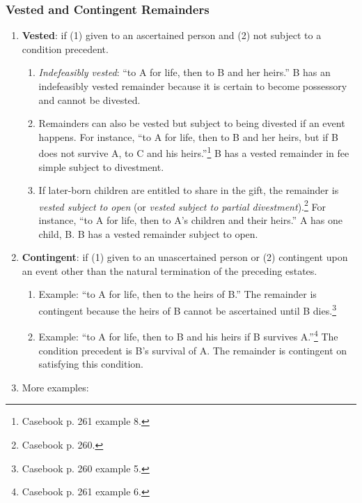 \subsubsection{Vested and Contingent Remainders}

\begin{enumerate}
    \item \textbf{Vested}: if (1) given to an ascertained person and (2) not 
    subject to a condition precedent.
    \begin{enumerate}
        \item \emph{Indefeasibly vested}:  ``to A for life, then to B and her 
        heirs.'' B has an indefeasibly vested remainder because it is certain 
        to become possessory and cannot be divested.
        \item Remainders can also be vested but subject to being divested if 
        an event happens. For instance, ``to A for life, then to B and her 
        heirs, but if B does not survive A, to C and his 
        heirs.''\footnote{Casebook p. 261 example 8.} B has a vested remainder 
        in fee simple subject to divestment.
        \item If later-born children are entitled to share in the gift, the 
        remainder is \emph{vested subject to open} (or \emph{vested subject to 
        partial divestment}).\footnote{Casebook p. 260.} For instance, ``to A 
        for life, then to A's children and their heirs.'' A has one child, B. 
        B has a vested remainder subject to open.
    \end{enumerate}
    \item \textbf{Contingent}: if (1) given to an unascertained person or (2) 
    contingent upon an event other than the natural termination of the 
    preceding estates.
    \begin{enumerate}
        \item Example: ``to A for life, then to the heirs of B.'' The 
        remainder is contingent because the heirs of B cannot be ascertained 
        until B dies.\footnote{Casebook p. 260 example 5.}
        \item Example: ``to A for life, then to B and his heirs if B survives 
        A.''\footnote{Casebook p. 261 example 6.} The condition precedent is 
        B's survival of A. The remainder is contingent on satisfying this 
        condition.
    \end{enumerate}
    \item More examples:

\end{enumerate}
